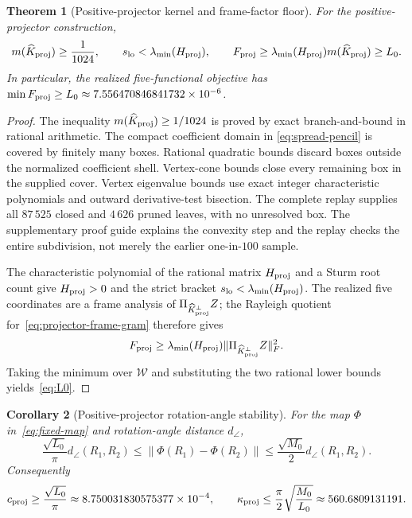 \documentclass[12pt]{article}
\newtheorem{theorem}{Theorem}[section]
\newtheorem{corollary}[theorem]{Corollary}
\theoremstyle{definition}
\theoremstyle{remark}
\begin{document}
\begin{theorem}[Positive-projector kernel and frame-factor floor]
\label{thm:projector-conditioning}
For the positive-projector construction,
\[
 m(\widehat K_{\rm proj})\geq\frac1{1024},
 \qquad s_{\rm lo}<\lambda_{\min}(H_{\rm proj}),
 \qquad F_{\rm proj}\geq
 \lambda_{\min}(H_{\rm proj})m(\widehat K_{\rm proj})\geq L_0.
\]
In particular, the realized five-functional objective has
$\min F_{\rm proj}\geq L_0\approx7.556470846841732\times10^{-6}$.
\end{theorem}

\begin{proof}
The inequality $m(\widehat K_{\rm proj})\geq1/1024$ is proved by exact
branch-and-bound in rational arithmetic.  The compact coefficient domain in
\eqref{eq:spread-pencil} is covered by finitely many boxes.  Rational
quadratic bounds discard boxes outside the normalized coefficient shell.
Vertex-cone bounds close every remaining box in the supplied cover.  Vertex
eigenvalue bounds use exact integer characteristic polynomials and outward
derivative-test bisection.  The complete replay supplies all $87\,525$
closed and $4\,626$ pruned leaves, with no unresolved box.  The supplementary
proof guide explains the convexity step and the replay checks the entire
subdivision, not merely the earlier one-in-$100$ sample.

The characteristic polynomial of the rational matrix $H_{\rm proj}$ and a
Sturm root count give $H_{\rm proj}>0$ and the strict bracket
$s_{\rm lo}<\lambda_{\min}(H_{\rm proj})$.  The realized five coordinates are
a frame analysis of $\Pi_{\widehat K_{\rm proj}^{\perp}}Z$; the Rayleigh
quotient for~\eqref{eq:projector-frame-gram} therefore gives
\[
 F_{\rm proj}\geq\lambda_{\min}(H_{\rm proj})
 \|\Pi_{\widehat K_{\rm proj}^{\perp}}Z\|_F^2.
\]
Taking the minimum over $\mathcal W$ and substituting the two rational lower
bounds yields~\eqref{eq:L0}.
\end{proof}

\begin{corollary}[Positive-projector rotation-angle stability]
\label{cor:projector-conditioning}
For the map $\Phi$ in~\eqref{eq:fixed-map} and rotation-angle
distance $d_\angle$,
\begin{equation}\label{eq:projector-angle-bounds}
 \frac{\sqrt{L_0}}{\pi}d_\angle(R_1,R_2)
 \leq\|\Phi(R_1)-\Phi(R_2)\|
 \leq\frac{\sqrt{M_0}}2d_\angle(R_1,R_2).
\end{equation}
Consequently
\[
 c_{\rm proj}\geq\frac{\sqrt{L_0}}\pi
 \approx8.750031830575377\times10^{-4},\qquad
 \kappa_{\rm proj}\leq\frac\pi2\sqrt{\frac{M_0}{L_0}}
 \approx560.6809131191.
\]
\end{corollary}
\end{document}
